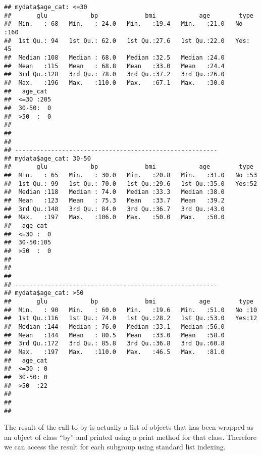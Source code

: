 \documentclass[]{book}
\newenvironment{Shaded}{\begin{snugshade}}{\end{snugshade}}
\newcommand{\KeywordTok}[1]{\textcolor[rgb]{0.13,0.29,0.53}{\textbf{#1}}}
\newcommand{\DecValTok}[1]{\textcolor[rgb]{0.00,0.00,0.81}{#1}}
\newcommand{\OperatorTok}[1]{\textcolor[rgb]{0.81,0.36,0.00}{\textbf{#1}}}
\newcommand{\NormalTok}[1]{#1}
\theoremstyle{definition}
\theoremstyle{definition}
\theoremstyle{definition}
\theoremstyle{remark}
\begin{document}
\begin{verbatim}
## mydata$age_cat: <=30
##       glu            bp             bmi            age        type    
##  Min.   : 68   Min.   : 24.0   Min.   :19.4   Min.   :21.0   No :160  
##  1st Qu.: 94   1st Qu.: 62.0   1st Qu.:27.6   1st Qu.:22.0   Yes: 45  
##  Median :108   Median : 68.0   Median :32.5   Median :24.0            
##  Mean   :115   Mean   : 68.8   Mean   :33.0   Mean   :24.4            
##  3rd Qu.:128   3rd Qu.: 78.0   3rd Qu.:37.2   3rd Qu.:26.0            
##  Max.   :196   Max.   :110.0   Max.   :67.1   Max.   :30.0            
##   age_cat   
##  <=30 :205  
##  30-50:  0  
##  >50  :  0  
##             
##             
##             
## -------------------------------------------------------- 
## mydata$age_cat: 30-50
##       glu            bp             bmi            age        type   
##  Min.   : 65   Min.   : 30.0   Min.   :20.8   Min.   :31.0   No :53  
##  1st Qu.: 99   1st Qu.: 70.0   1st Qu.:29.6   1st Qu.:35.0   Yes:52  
##  Median :118   Median : 74.0   Median :33.3   Median :38.0           
##  Mean   :123   Mean   : 75.3   Mean   :33.7   Mean   :39.2           
##  3rd Qu.:148   3rd Qu.: 84.0   3rd Qu.:36.7   3rd Qu.:43.0           
##  Max.   :197   Max.   :106.0   Max.   :50.0   Max.   :50.0           
##   age_cat   
##  <=30 :  0  
##  30-50:105  
##  >50  :  0  
##             
##             
##             
## -------------------------------------------------------- 
## mydata$age_cat: >50
##       glu            bp             bmi            age        type   
##  Min.   : 90   Min.   : 60.0   Min.   :19.6   Min.   :51.0   No :10  
##  1st Qu.:116   1st Qu.: 74.0   1st Qu.:28.2   1st Qu.:53.0   Yes:12  
##  Median :144   Median : 76.0   Median :33.1   Median :56.0           
##  Mean   :144   Mean   : 80.5   Mean   :33.0   Mean   :58.0           
##  3rd Qu.:172   3rd Qu.: 85.8   3rd Qu.:36.8   3rd Qu.:60.8           
##  Max.   :197   Max.   :110.0   Max.   :46.5   Max.   :81.0           
##   age_cat  
##  <=30 : 0  
##  30-50: 0  
##  >50  :22  
##            
##            
## 
\end{verbatim}

The result of the call to by is actually a list of objects that has been
wrapped as an object of class ``by'' and printed using a print method
for that class. Therefore we can access the result for each subgroup
using standard list indexing.

\begin{Shaded}
\end{Shaded}
\end{document}
